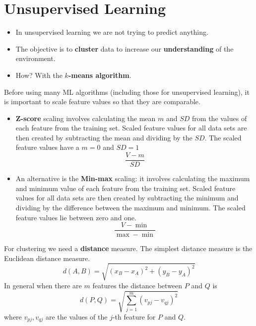 \section{Unsupervised Learning}

\begin{itemize}
    \item In unsupervised learning we are not trying to predict anything.
    \item The objective is to \textbf{cluster} data to increase our \textbf{understanding} of the environment.
    \item How? With the \textbf{$k$-means algorithm}.
\end{itemize}

Before using many ML algorithms (including those for unsupervised learning), it is important to scale feature values so that they are comparable.
\begin{itemize}
    \item \textbf{Z-score} scaling involves calculating the mean $m$ and $SD$ from the values of each feature from the training set. Scaled feature values for all data sets are then created by subtracting the mean and dividing by the $SD$. The scaled feature values have a $m=0$ and $SD=1$
          \begin{equation*}
              \frac{V-m}{SD}
          \end{equation*}
    \item An alternative is the \textbf{Min-max} scaling: it involves calculating the maximum and minimum value of each feature from the training set. Scaled feature values for all data sets are then created by subtracting the minimum and dividing by the difference between the maximum and minimum. The scaled feature values lie between zero and one.
          \begin{equation*}
              \frac{V-\min}{\max -\min}
          \end{equation*}
\end{itemize}

For clustering we need a \textbf{distance} measure. The simplest distance measure is the Euclidean distance measure.
\begin{equation*}
    d\left(A,B\right) =\sqrt{\left(x_{B} -x_{A}\right)^{2} +\left(y_{B} -y_{A}\right)^{2}}
\end{equation*}
In general when there are $m$ features the distance between $P$ and $Q$ is
\begin{equation*}
    d\left(P,Q\right) =\sqrt{\sum\limits _{j=1}^{m}\left(v_{pj} -v_{qj}\right)^{2}}
\end{equation*}
where $v_{pj},v_{qj}$ are the values of the $j$-th feature for $P$ and $Q$.

